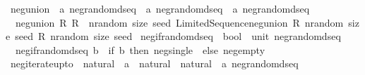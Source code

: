 \begin{isabellebody}
\isanewline
{}\isamarkupfalse%
\ neg{\isacharunderscore}{\kern0pt}union\ {\isacharcolon}{\kern0pt}{\isacharcolon}{\kern0pt}\ {\isachardoublequoteopen}{\isacharprime}{\kern0pt}a\ neg{\isacharunderscore}{\kern0pt}random{\isacharunderscore}{\kern0pt}dseq\ {\isacharequal}{\kern0pt}{\isachargreater}{\kern0pt}\ {\isacharprime}{\kern0pt}a\ neg{\isacharunderscore}{\kern0pt}random{\isacharunderscore}{\kern0pt}dseq\ {\isacharequal}{\kern0pt}{\isachargreater}{\kern0pt}\ {\isacharprime}{\kern0pt}a\ neg{\isacharunderscore}{\kern0pt}random{\isacharunderscore}{\kern0pt}dseq{\isachardoublequoteclose}\isanewline
{}\isanewline
\ \ {\isachardoublequoteopen}neg{\isacharunderscore}{\kern0pt}union\ R{}\ R{}\ {\isacharequal}{\kern0pt}\ {\isacharparenleft}{\kern0pt}{\isasymlambda}nrandom\ size\ seed{\isachardot}{\kern0pt}\ Limited{\isacharunderscore}{\kern0pt}Sequence{\isachardot}{\kern0pt}neg{\isacharunderscore}{\kern0pt}union\ {\isacharparenleft}{\kern0pt}R{}\ nrandom\ size\ seed{\isacharparenright}{\kern0pt}\ {\isacharparenleft}{\kern0pt}R{}\ nrandom\ size\ seed{\isacharparenright}{\kern0pt}{\isacharparenright}{\kern0pt}{\isachardoublequoteclose}\isanewline
\isanewline
{}\isamarkupfalse%
\ neg{\isacharunderscore}{\kern0pt}if{\isacharunderscore}{\kern0pt}random{\isacharunderscore}{\kern0pt}dseq\ {\isacharcolon}{\kern0pt}{\isacharcolon}{\kern0pt}\ {\isachardoublequoteopen}bool\ {\isacharequal}{\kern0pt}{\isachargreater}{\kern0pt}\ unit\ neg{\isacharunderscore}{\kern0pt}random{\isacharunderscore}{\kern0pt}dseq{\isachardoublequoteclose}\isanewline
{}\isanewline
\ \ {\isachardoublequoteopen}neg{\isacharunderscore}{\kern0pt}if{\isacharunderscore}{\kern0pt}random{\isacharunderscore}{\kern0pt}dseq\ b\ {\isacharequal}{\kern0pt}\ {\isacharparenleft}{\kern0pt}if\ b\ then\ neg{\isacharunderscore}{\kern0pt}single\ {\isacharparenleft}{\kern0pt}{\isacharparenright}{\kern0pt}\ else\ neg{\isacharunderscore}{\kern0pt}empty{\isacharparenright}{\kern0pt}{\isachardoublequoteclose}\isanewline
\isanewline
{}\isamarkupfalse%
\ neg{\isacharunderscore}{\kern0pt}iterate{\isacharunderscore}{\kern0pt}upto\ {\isacharcolon}{\kern0pt}{\isacharcolon}{\kern0pt}\ {\isachardoublequoteopen}{\isacharparenleft}{\kern0pt}natural\ {\isacharequal}{\kern0pt}{\isachargreater}{\kern0pt}\ {\isacharprime}{\kern0pt}a{\isacharparenright}{\kern0pt}\ {\isacharequal}{\kern0pt}{\isachargreater}{\kern0pt}\ natural\ {\isacharequal}{\kern0pt}{\isachargreater}{\kern0pt}\ natural\ {\isacharequal}{\kern0pt}{\isachargreater}{\kern0pt}\ {\isacharprime}{\kern0pt}a\ neg{\isacharunderscore}{\kern0pt}random{\isacharunderscore}{\kern0pt}dseq{\isachardoublequoteclose}\isanewline

\end{isabellebody}
